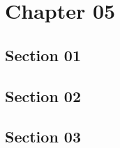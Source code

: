 \chapter{Chapter 05}
\section{Section 01}
\lipsum[1-5]
\section{Section 02}
\lipsum[1-5]
\section{Section 03}
\lipsum[1-5]